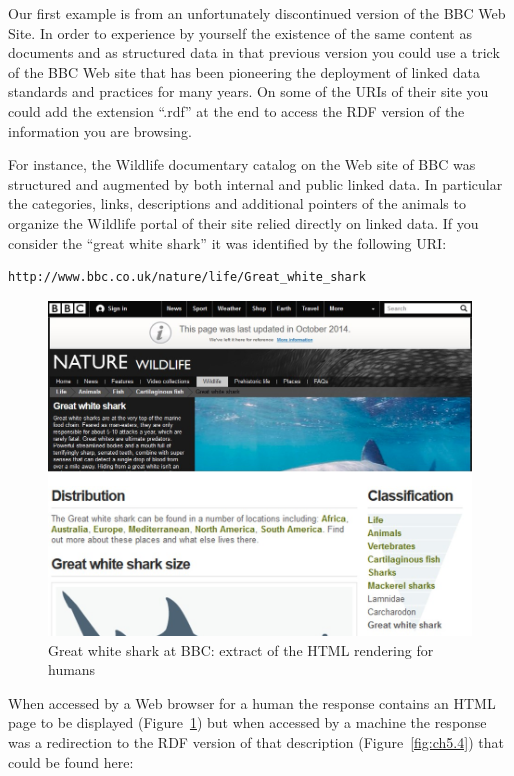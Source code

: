 Our first example is from an unfortunately discontinued version of the
BBC Web Site. In order to experience by yourself the existence of the
same content as documents and as structured data in that previous
version you could use a trick of the BBC Web site that has been
pioneering the deployment of linked data standards and practices for
many years. On some of the URIs of their site you could add the
extension ``.rdf'' at the end to access the RDF version of the
information you are browsing.

For instance, the Wildlife documentary catalog on the Web site of BBC
was structured and augmented by both internal and public linked data. In
particular the categories, links, descriptions and additional pointers
of the animals to organize the Wildlife portal of their site relied
directly on linked data. If you consider the ``great white shark'' it
was identified by the following URI:

\begin{lstlisting}
http://www.bbc.co.uk/nature/life/Great_white_shark
\end{lstlisting}

\begin{figure}
    \centering
     \includegraphics[width=5.0in]{media/figure-05-03.jpg}
    \caption{Great white shark at BBC: extract of the HTML rendering for
humans}
    \label{fig:ch5.3}
\end{figure}


When accessed by a Web browser for a human the response contains an HTML
page to be displayed (Figure~\ref{fig:ch5.3}) but when accessed by a machine the
response was a redirection to the RDF version of that description
(Figure~\ref{fig:ch5.4}) that could be found here:


